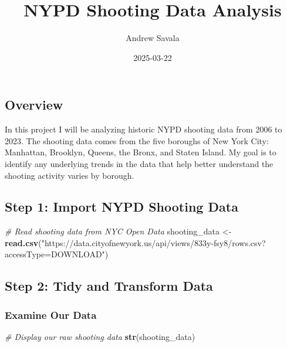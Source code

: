 \documentclass[
]{article}
\title{NYPD Shooting Data Analysis}
\author{Andrew Savala}
\date{2025-03-22}
\newenvironment{Shaded}{\begin{snugshade}}{\end{snugshade}}
\newcommand{\CommentTok}[1]{\textcolor[rgb]{0.56,0.35,0.01}{\textit{#1}}}
\newcommand{\FunctionTok}[1]{\textcolor[rgb]{0.13,0.29,0.53}{\textbf{#1}}}
\newcommand{\NormalTok}[1]{#1}
\newcommand{\OtherTok}[1]{\textcolor[rgb]{0.56,0.35,0.01}{#1}}
\newcommand{\StringTok}[1]{\textcolor[rgb]{0.31,0.60,0.02}{#1}}
\begin{document}
\maketitle

\subsection{Overview}\label{overview}

In this project I will be analyzing historic NYPD shooting data from
2006 to 2023. The shooting data comes from the five boroughs of New York
City: Manhattan, Brooklyn, Queens, the Bronx, and Staten Island. My goal
is to identify any underlying trends in the data that help better
understand the shooting activity varies by borough.

\subsection{Step 1: Import NYPD Shooting
Data}\label{step-1-import-nypd-shooting-data}

\begin{Shaded}
\begin{Highlighting}[]
\CommentTok{\# Read shooting data from NYC Open Data}
\NormalTok{shooting\_data }\OtherTok{\textless{}{-}} \FunctionTok{read.csv}\NormalTok{(}\StringTok{"https://data.cityofnewyork.us/api/views/833y{-}fsy8/rows.csv?accessType=DOWNLOAD"}\NormalTok{)}
\end{Highlighting}
\end{Shaded}

\subsection{Step 2: Tidy and Transform
Data}\label{step-2-tidy-and-transform-data}

\subsubsection{Examine Our Data}\label{examine-our-data}

\begin{Shaded}
\begin{Highlighting}[]
\CommentTok{\# Display our raw shooting data}
\FunctionTok{str}\NormalTok{(shooting\_data)}
\end{Highlighting}
\end{Shaded}
\end{document}
